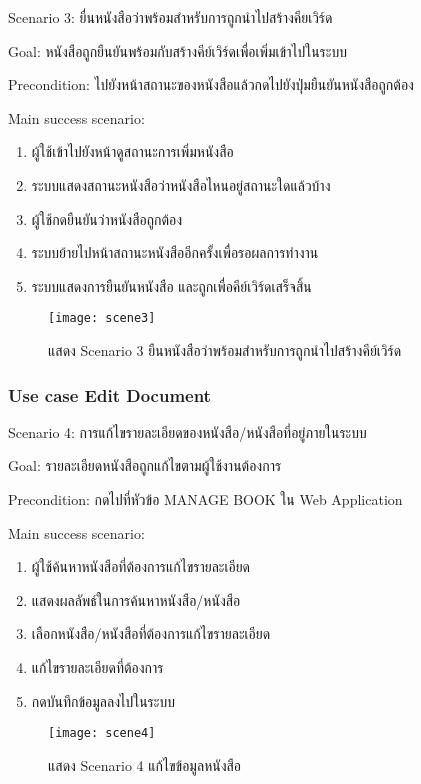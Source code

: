 Scenario 3: ยื่นหนังสือว่าพร้อมสำหรับการถูกนำไปสร้างคียเวิร์ด

Goal: หนังสือถูกยืนยันพร้อมกับสร้างคีย์เวิร์ดเพื่อเพิ่มเข้าไปในระบบ

Precondition: ไปยังหน้าสถานะของหนังสือแล้วกดไปยังปุ่มยืนยันหนังสือถูกต้อง

Main success scenario:

\begin{enumerate}
    \item ผู้ใช้เข้าไปยังหน้าดูสถานะการเพิ่มหนังสือ
    \item ระบบแสดงสถานะหนังสือว่าหนังสือไหนอยู่สถานะใดแล้วบ้าง
    \item ผู้ใช้กดยืนยันว่าหนังสือถูกต้อง
    \item ระบบย้ายไปหน้าสถานะหนังสืออีกครั้งเพื่อรอผลการทำงาน
    \item ระบบแสดงการยืนยันหนังสือ และถูกเพื่อคีย์เวิร์ดเสร็จสิ้น
\end{enumerate}
\begin{figure}[H]
    \centering
    \texttt{[image: scene3]}
    \caption{แสดง Scenario 3 ยืนหนังสือว่าพร้อมสำหรับการถูกนำไปสร้างคีย์เวิร์ด}\label{fig:scene3}
\end{figure}

\subsubsection{Use case Edit Document}

Scenario 4: การแก้ไขรายละเอียดของหนังสือ/หนังสือที่อยู่ภายในระบบ

Goal: รายละเอียดหนังสือถูกแก้ไขตามผู้ใช้งานต้องการ

Precondition: กดไปที่หัวข้อ MANAGE BOOK ใน Web Application

Main success scenario:

\begin{enumerate}
    \item ผู้ใช้ค้นหาหนังสือที่ต้องการแก้ไขรายละเอียด
    \item แสดงผลลัพธ์ในการค้นหาหนังสือ/หนังสือ
    \item เลือกหนังสือ/หนังสือที่ต้องการแก้ไขรายละเอียด
    \item แก้ไขรายละเอียดที่ต้องการ
    \item กดบันทึกข้อมูลลงไปในระบบ
\end{enumerate}
\begin{figure}[H]
    \centering
    \texttt{[image: scene4]}
    \caption{แสดง Scenario 4 แก้ไขข้อมูลหนังสือ}\label{fig:scene4}
\end{figure}


